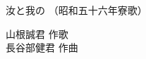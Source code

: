 \documentclass[10pt,b5j]{tarticle} %
\begin{document}
\begin{minipage}[c]{0.7\hsize} %
    \begin{center}
        {\LARGE
            汝と我の %
        }
        {\small 
            （昭和五十六年寮歌） %
        }
    \end{center}
\end{minipage}
\begin{minipage}[c]{0.3\hsize} %
    \begin{flushright} %
        山根誠君 作歌\\長谷部健君 作曲 %
    \end{flushright}
\end{minipage}
\end{document}
